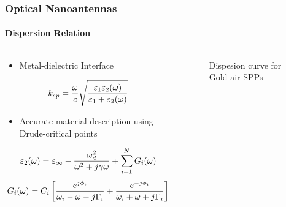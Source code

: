 \documentclass[mathserif,18pt,xcolor=table]{beamer}
\begin{document}
\begin{frame}
  \frametitle{Optical Nanoantennas}
  \framesubtitle{Dispersion Relation}
  \begin{columns}[T] %
    \begin{column}{.5\textwidth}
      \begin{itemize}
        \item Metal-dielectric Interface
      \end{itemize}
      \begin{equation} \nonumber
        k_{sp}=\frac{\omega}{c}\sqrt {\dfrac {\varepsilon_{1}\varepsilon_{2}(\omega)} {\varepsilon_{1} + \varepsilon_{2}(\omega)}}
        \label{eq:dis_spp}
      \end{equation}
      \begin{itemize}
        \item Accurate material description using Drude-critical points
      \end{itemize}
      \begin{equation} \nonumber
          \varepsilon_2(\omega) = \varepsilon_{\infty} - \frac{\omega_{d}^{2}}{\omega^2 + j\gamma \omega} + \sum \limits_{i = 1}^N G_i(\omega)
        \label{eq:eps_drude_cp}
        \end{equation}
        \begin{equation} \nonumber
            G_i(\omega) = C_i \left[ \frac{e^{j \phi_i}}{\omega_i - \omega - j \Gamma_i} + \frac{e^{-j \phi_i}}{\omega_i + \omega + j \Gamma_i} \right]
          \label{eq:CP_terms}
          \end{equation}
    \end{column}
    \begin{column}[T]{.5\textwidth}
      \begin{figure}
        \vspace*{-2cm}
        
        \label{fig:ep_gold}
        \caption{Dispesion curve for Gold-air SPPs}
      \end{figure}
      \begin{figure}
        \vspace*{-1cm}
        
        \label{fig:disp_gold}
      \end{figure}
    \end{column}
  \end{columns}
\end{frame}
\end{document}
